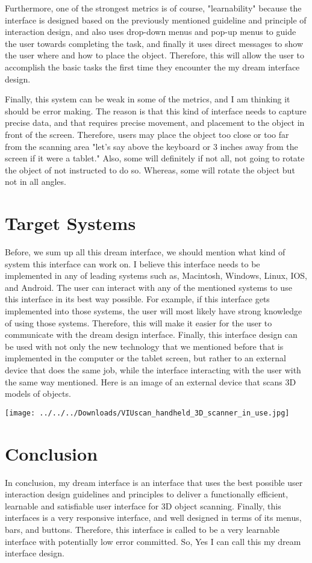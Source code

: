 \documentclass[12pt, oneside]{amsart}   	%
\begin{document}
Furthermore, one of the strongest metrics is of course, "learnability" because the interface is designed based on the previously mentioned guideline and principle of interaction design, and also uses drop-down menus and pop-up menus to guide the user towards completing the task, and finally it uses direct messages to show the user where and how to place the object.  Therefore,  this will allow the user to accomplish the basic tasks the first time they encounter the my dream interface design.

Finally, this system can be weak in some of the metrics, and I am thinking it should be error making.  The reason is that this kind of interface needs to capture precise data, and that requires precise movement, and placement to the object in front of the screen.  Therefore, users may place the object too close or too far from the scanning area "let's say above the keyboard or 3 inches away from the screen if it were a tablet."  Also, some will definitely if not all, not going to rotate the object of not instructed to do so. Whereas, some will rotate the object but not in all angles.  

\section{Target Systems}

Before, we sum up all this dream interface, we should mention what kind of system this interface can work on.  I believe this interface needs to be implemented in any of leading systems such as, Macintosh, Windows, Linux, IOS, and Android.  The user can interact with any of the mentioned systems to use this interface in its best way possible.  For example, if this interface gets implemented into those systems, the user will most likely have strong knowledge of using those systems.  Therefore, this will make it easier for the user to communicate with the dream design interface.  Finally, this interface design can be used with not only the new technology that we mentioned before that is implemented in the computer or the tablet screen, but rather to an external device that does the same job, while the interface interacting with the user with the same way mentioned.
Here is an image of an external device that scans 3D models of objects\cite{BeforeLast}.

\texttt{[image: ../../../Downloads/VIUscan\_handheld\_3D\_scanner\_in\_use.jpg]}


\section{Conclusion}

In conclusion, my dream interface is an interface that uses the best possible user interaction design guidelines and principles to deliver a functionally efficient, learnable and satisfiable user interface for 3D object scanning. 
Finally, this interfaces is a very responsive interface, and well designed in terms of its menus, bars, and buttons. Therefore, this interface is called to be a very learnable interface with potentially low error committed.  So, Yes I can call this my dream interface design.
 

\end{document}
